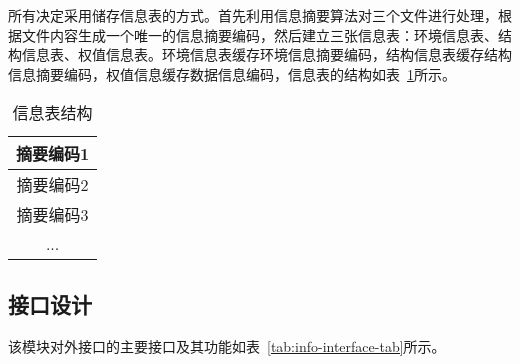 所有决定采用储存信息表的方式。首先利用信息摘要算法对三个文件进行处理，根据文件内容生成一个唯一的信息摘要编码，然后建立三张信息表：环境信息表、结构信息表、权值信息表。环境信息表缓存环境信息摘要编码，结构信息表缓存结构信息摘要编码，权值信息缓存数据信息编码，信息表的结构如表~\ref{tab:info-tab}所示。

\begin{table}[htb]
  \centering\small
  \caption{信息表结构}
  \label{tab:info-tab}
  \begin{tabular}{c}
    \hline
    摘要编码1    \\ \hline
    摘要编码2    \\ \hline
    摘要编码3    \\ \hline
    ...         \\ \hline
  \end{tabular}
\end{table}

\subsection {接口设计}
该模块对外接口的主要接口及其功能如表~\ref{tab:info-interface-tab}所示。

